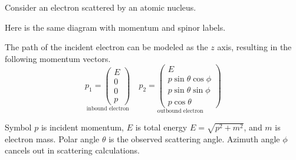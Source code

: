 \documentclass[12pt]{article}
\begin{document}
\noindent
Consider an electron scattered by an atomic nucleus.
\begin{center}
\end{center}

\noindent
Here is the same diagram with momentum and spinor labels.
\begin{center}
\end{center}

\noindent
The path of the incident electron can be modeled as the $z$ axis,
resulting in the following momentum vectors.
\begin{equation*}
\underset{\text{inbound electron}}
{p_1=\begin{pmatrix}E\\0\\0\\p\end{pmatrix}}
\quad
\underset{\text{outbound electron}}
{
p_2=\begin{pmatrix}
E\\
p\sin\theta\cos\phi\\
p\sin\theta\sin\phi\\
p\cos\theta
\end{pmatrix}
}
\end{equation*}

\noindent
Symbol $p$ is incident momentum,
$E$ is total energy $E=\sqrt{p^2+m^2}$,
and $m$ is electron mass.
Polar angle $\theta$ is the observed scattering angle.
Azimuth angle $\phi$ cancels out in scattering calculations.
\end{document}
